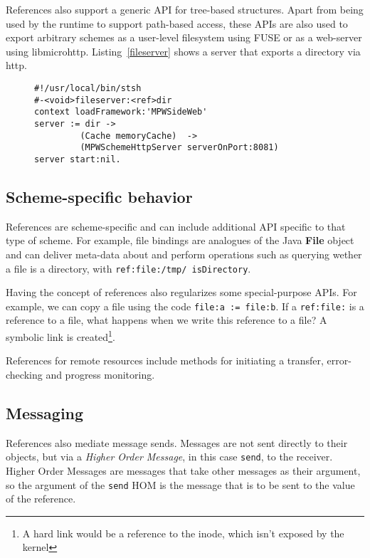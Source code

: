 \documentclass[preprint,authoryear]{llncs}
\begin{document}
References also support a generic API for tree-based structures.   Apart from being used
by the runtime to support path-based access, these APIs are also used to export arbitrary
schemes as a user-level filesystem using FUSE or as a web-server using libmicrohttp.
Listing~\ref{fileserver} shows a server that exports a directory via http.

\begin{figure}[htbp]
\begin{lstlisting}[style=L,label=fileserver,caption=Exporting a directory via http.]
#!/usr/local/bin/stsh
#-<void>fileserver:<ref>dir
context loadFramework:'MPWSideWeb'
server := dir -> 
         (Cache memoryCache)  -> 
         (MPWSchemeHttpServer serverOnPort:8081)
server start:nil.
\end{lstlisting}
\end{figure}



\subsection{Scheme-specific behavior}

References are scheme-specific and can include additional API specific to that type of scheme.
For example, file bindings are analogues of the Java {\bf File} object and can deliver
meta-data about and perform operations such as querying wether a file is a directory, with
{\tt ref:file:/tmp/ isDirectory}.


Having the concept of references also regularizes some special-purpose APIs.  For example,
we can copy a file using the code {\tt file:a := file:b}.  If a {\tt ref:file:} is a reference to a file, what
happens when we write this reference to a file?  A symbolic link is created\footnote{A hard link
would be a reference to the inode, which isn't exposed by the kernel}.

References for remote resources include methods for initiating a transfer,
error-checking and progress monitoring.  

\subsection{Messaging}

References also mediate message sends.   Messages are not sent directly to their objects, but via a
\emph{Higher Order Message}\cite{HOM}, in this case {\tt send}, to the receiver.    Higher Order Messages
are messages that take other messages as their argument, so the argument of the {\tt send} HOM is the
message that is to be sent to the value of the reference.  
\end{document}
